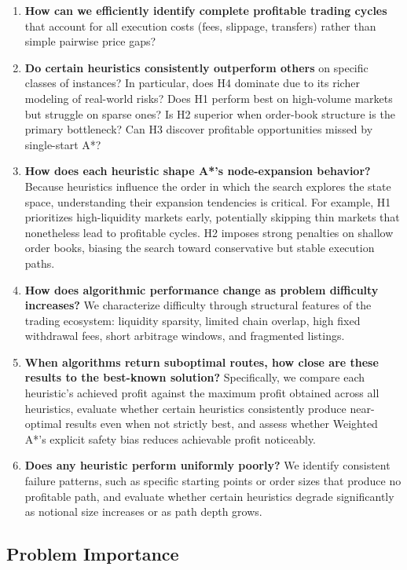 \documentclass[11pt]{article}
\begin{document}
\begin{enumerate}
\item \textbf{How can we efficiently identify complete profitable trading cycles} that account for all execution costs (fees, slippage, transfers) rather than simple pairwise price gaps?
\item \textbf{Do certain heuristics consistently outperform others} on specific classes of instances? In particular, does H4 dominate due to its richer modeling of real-world risks? Does H1 perform best on high-volume markets but struggle on sparse ones? Is H2 superior when order-book structure is the primary bottleneck? Can H3 discover profitable opportunities missed by single-start A*?
\item \textbf{How does each heuristic shape A*'s node-expansion behavior?} Because heuristics influence the order in which the search explores the state space, understanding their expansion tendencies is critical. For example, H1 prioritizes high-liquidity markets early, potentially skipping thin markets that nonetheless lead to profitable cycles. H2 imposes strong penalties on shallow order books, biasing the search toward conservative but stable execution paths.
\item \textbf{How does algorithmic performance change as problem difficulty increases?} We characterize difficulty through structural features of the trading ecosystem: liquidity sparsity, limited chain overlap, high fixed withdrawal fees, short arbitrage windows, and fragmented listings.
\item \textbf{When algorithms return suboptimal routes, how close are these results to the best-known solution?} Specifically, we compare each heuristic's achieved profit against the maximum profit obtained across all heuristics, evaluate whether certain heuristics consistently produce near-optimal results even when not strictly best, and assess whether Weighted A*'s explicit safety bias reduces achievable profit noticeably.
\item \textbf{Does any heuristic perform uniformly poorly?} We identify consistent failure patterns, such as specific starting points or order sizes that produce no profitable path, and evaluate whether certain heuristics degrade significantly as notional size increases or as path depth grows.
\end{enumerate}

\subsection{Problem Importance}
\end{document}
